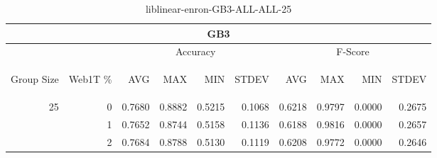 \begin{center}
\begin{table}[htbp]
\begin{tabular}{ | r | r | r | r | r | r | r | r | r | r |}
\hline
\multicolumn{10}{|c|}{GB3}\\
\hline
 & & \multicolumn{4}{|c|}{Accuracy} & \multicolumn{4}{|c|}{F-Score}\\ \cline{3-10}
\begin{sideways}Group Size\end{sideways} & \begin{sideways}Web1T \%\end{sideways} & \begin{sideways}AVG\end{sideways} & \begin{sideways}MAX\end{sideways} & \begin{sideways}MIN\end{sideways} & \begin{sideways}STDEV\end{sideways} & \begin{sideways}AVG\end{sideways} & \begin{sideways}MAX\end{sideways} & \begin{sideways}MIN\end{sideways} & \begin{sideways}STDEV\end{sideways}\\
\hline
\multirow{2}{*}{25}
 & 0 & 0.7680 & 0.8882 & 0.5215 & 0.1068 & 0.6218 & 0.9797 & 0.0000 & 0.2675\\ \cline{2-10}
 & 1 & 0.7652 & 0.8744 & 0.5158 & 0.1136 & 0.6188 & 0.9816 & 0.0000 & 0.2657\\ \cline{2-10}
 & 2 & 0.7684 & 0.8788 & 0.5130 & 0.1119 & 0.6208 & 0.9772 & 0.0000 & 0.2646\\ \cline{2-10}
\hline
\end{tabular}
\caption{liblinear-enron-GB3-ALL-ALL-25}
\label{table:liblinear-enron-GB3-ALL-ALL-25}
\end{table}
\end{center}

